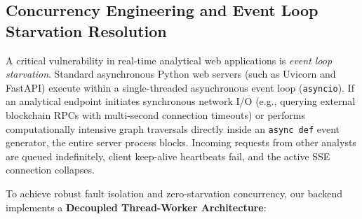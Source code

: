 \subsection{Concurrency Engineering and Event Loop Starvation Resolution}

A critical vulnerability in real-time analytical web applications is \emph{event loop starvation}. Standard asynchronous Python web servers (such as Uvicorn and FastAPI) execute within a single-threaded asynchronous event loop (\texttt{asyncio}). If an analytical endpoint initiates synchronous network I/O (e.g., querying external blockchain RPCs with multi-second connection timeouts) or performs computationally intensive graph traversals directly inside an \texttt{async def} event generator, the entire server process blocks. Incoming requests from other analysts are queued indefinitely, client keep-alive heartbeats fail, and the active SSE connection collapses.

To achieve robust fault isolation and zero-starvation concurrency, our backend implements a \textbf{Decoupled Thread-Worker Architecture}:

